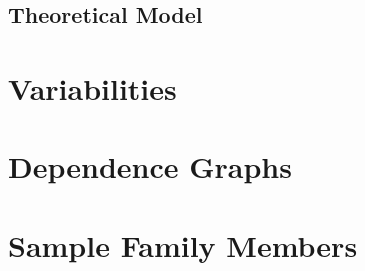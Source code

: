 \documentclass{article}
\begin{document}
\subsection{Theoretical Model}


\section{Variabilities}


\section{Dependence Graphs}


\section{Sample Family Members} \label{Sec_SampleFamilyMembers}


\newpage




\end{document}
